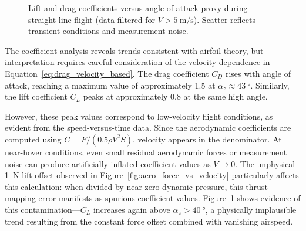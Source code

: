 \begin{figure}[htbp]
  \centering
  \caption{Lift and drag coefficients versus angle-of-attack proxy during straight-line flight (data filtered for $V > \SI{5}{\meter\per\second}$). Scatter reflects transient conditions and measurement noise.}
  \label{fig:coeffs_vs_alpha}
\end{figure}

The coefficient analysis reveals trends consistent with airfoil theory, but interpretation requires careful consideration of the velocity dependence in Equation~\ref{eq:drag_velocity_based}.
The drag coefficient $C_D$ rises with angle of attack, reaching a maximum value of approximately 1.5 at $\alpha_z \approx \SI{43}{\degree}$.
Similarly, the lift coefficient $C_L$ peaks at approximately 0.8 at the same high angle.

However, these peak values correspond to low-velocity flight conditions, as evident from the speed-versus-time data.
Since the aerodynamic coefficients are computed using $C = F / (0.5 \rho V^2 S)$, velocity appears in the denominator.
At near-hover conditions, even small residual aerodynamic forces or measurement noise can produce artificially inflated coefficient values as $V \to 0$.
The unphysical \SI{1}{\newton} lift offset observed in Figure~\ref{fig:aero_force_vs_velocity} particularly affects this calculation: when divided by near-zero dynamic pressure, this thrust mapping error manifests as spurious coefficient values.
Figure~\ref{fig:coeffs_vs_alpha} shows evidence of this contamination—$C_L$ increases again above $\alpha_z > \SI{40}{\degree}$, a physically implausible trend resulting from the constant force offset combined with vanishing airspeed.

